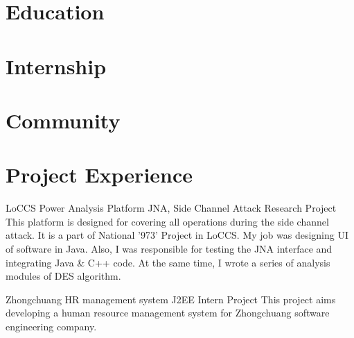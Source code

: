 \documentclass[11pt,a4paper]{moderncv}
\begin{document}
\maketitle

\section{Education}


\section{Internship}

\section{Community}

\section{Project Experience}

{LoCCS Power Analysis Platform}
{JNA, Side Channel Attack}
{Research Project}{}
{
This platform is designed for covering all operations during the side channel attack.
It is a part of National '973' Project in LoCCS. My job was designing UI of software in Java.
Also, I was responsible for testing the JNA interface and integrating Java \& C++ code.
At the same time, I wrote a series of analysis modules of DES algorithm.
}

\vspace*{0.2\baselineskip}
{Zhongchuang HR management system}
{J2EE}
{Intern Project}{}
{
This project aims developing a human resource management system for Zhongchuang software engineering company. 
}
\end{document}
